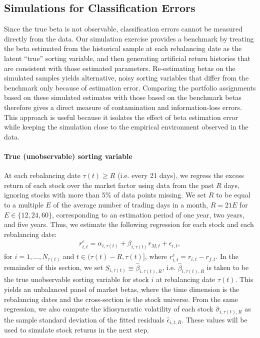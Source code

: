 \subsection{Simulations for Classification Errors}

Since the true beta is not observable, classification errors cannot be measured directly from the data. Our simulation exercise provides a benchmark by treating the beta estimated from the historical sample at each rebalancing date as the latent ``true'' sorting variable, and then generating artificial return histories that are consistent with those estimated parameters. Re-estimating betas on the simulated samples yields alternative, noisy sorting variables that differ from the benchmark only because of estimation error. Comparing the portfolio assignments based on these simulated estimates with those based on the benchmark betas therefore gives a direct measure of contamination and information-loss errors. This approach is useful because it isolates the effect of beta estimation error while keeping the simulation close to the empirical environment observed in the data.

\paragraph{True (unobservable) sorting variable} At each rebalancing date $\tau(t) \geq R$ (i.e. every 21 days), we regress the excess return of each stock over the market factor using data from the past $R$ days, ignoring stocks with more than 5\% of data points missing. We set $R$ to be equal to a multiple $E$ of the average number of trading days in a month, $R=21 E$ for $E \in \{12,24,60\}$, corresponding to an estimation period of one year, two years, and five years. Thus, we estimate the following regression for each stock and each rebalancing date:
\begin{align}
\label{reg_estim}
    r_{i,t}^e = \alpha_{i,\tau(t)} + \beta_{i, \tau(t)} r_{M,t} + \epsilon_{i,t},
\end{align}
for $i=1, \dots, N_{\tau(t)}$ and $t \in (\tau(t)-R, \tau(t)]$, where $r_{i,t}^e = r_{i,t} - r_{f,t}$. In the remainder of this section, we set $S_{i,\tau(t)} \equiv \widehat{\beta}_{i,\tau(t),R}$, i.e. $\widehat{\beta}_{i,\tau(t),R}$ is taken to be the true unobservable sorting variable for stock $i$ at rebalancing date $\tau(t)$. This yields an unbalanced panel of market betas, where the time dimension is the rebalancing dates and the cross-section is the stock universe. From the same regression, we also compute the idiosyncratic volatility of each stock $\widehat{\sigma}_{i,\tau(t),R}$ as the sample standard deviation of the fitted residuals $\widehat{\epsilon}_{i,t,R}$. These values will be used to simulate stock returns in the next step.

